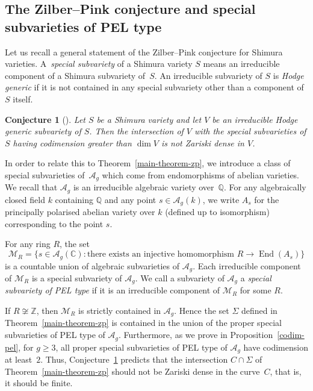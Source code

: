 \documentclass[JEP,XML,SOM,Unicode,NoFloatCountersInSection]{cedram}
\let\ra\rightarrow
\newcommand{\bC}{\mathbb{C}}
\newcommand{\bQ}{\mathbb{Q}}
\newcommand{\bZ}{\mathbb{Z}}
\newcommand{\cA}{\mathcal{A}}
\newcommand{\cM}{\mathcal{M}}
\newcommand{\Ag}{\mathcal{A}_g}
\DeclareMathOperator{\End}{End}
\newcommand{\defterm}[1]{\emph{#1}}
\newtheorem{conjecture}[lemma]{Conjecture}
\begin{document}
\subsection{The Zilber--Pink conjecture and special subvarieties of PEL type} \label{subsec:intro-zp-context}

Let us recall a general statement of the Zilber--Pink conjecture for Shimura varieties. A~\defterm{special subvariety} of a Shimura variety $S$ means an irreducible component of a Shimura subvariety of~$S$.
An irreducible subvariety of $S$ is \defterm{Hodge generic} if it is not contained in any special subvariety other than a component of $S$ itself.

\begin{conjecture}[{\cite[Conj.\,1.3]{pink:generalisation}}] \label{zilber-pink}
Let $S$ be a Shimura variety and let $V$ be an irreducible Hodge generic subvariety of $S$.
Then the intersection of $V$ with the special subvarieties of $S$ having codimension greater than $\dim V$ is not Zariski dense in $V$.
\end{conjecture}

In order to relate this to Theorem~\ref{main-theorem-zp}, we introduce a class of special subvarieties of~$\Ag$ which come from endomorphisms of abelian varieties.
We recall that $\cA_g$ is an irreducible algebraic variety over~$\bQ$.
For any algebraically closed field $k$ containing $\bQ$ and any point $s \in \Ag(k)$, we write $A_s$ for the principally polarised abelian variety over $k$ (defined up to isomorphism) corresponding to the point $s$.

For any ring $R$, the set
\[
\cM_R = \{ s \in \Ag(\bC) : \text{there exists an injective homomorphism } R \ra \End(A_s) \}
\]
is a countable union of algebraic subvarieties of $\Ag$.
Each irreducible component of $\cM_R$ is a special subvariety of $\Ag$.
We call a subvariety of $\Ag$ a \defterm{special subvariety of PEL type} if it is an irreducible component of $\cM_R$ for some $R$.

If $R \not\cong \bZ$, then $\cM_R$ is strictly contained in $\Ag$.
Hence the set $\Sigma$ defined in Theorem~\ref{main-theorem-zp} is contained in the union of the proper special subvarieties of PEL type of $\Ag$.
Furthermore, as we prove in Proposition~\ref{codim-pel}, for $g \geq 3$, all proper special subvarieties of PEL type of $\Ag$ have codimension at least~$2$.
Thus, Conjecture~\ref{zilber-pink} predicts that the intersection $C \cap \Sigma$ of Theorem~\ref{main-theorem-zp} should not be Zariski dense in the curve~$C$, that is, it should be finite.
\end{document}
